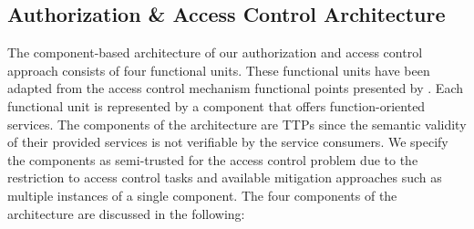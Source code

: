 \subsection{Authorization \& Access Control Architecture}
\label{sec:approach:sabaac:architecture}
The component-based architecture of our authorization and access control approach consists of four functional units.
These functional units have been adapted from the access control mechanism functional points presented by \citeauthor{Hu2014} \cite{Hu2014}.
Each functional unit is represented by a component that offers function-oriented services.
The components of the architecture are TTPs since the semantic validity of their provided services is not verifiable by the service consumers.
We specify the components as semi-trusted for the access control problem due to the restriction to access control tasks and available mitigation approaches such as multiple instances of a single component.
The four components of the architecture are discussed in the following:
